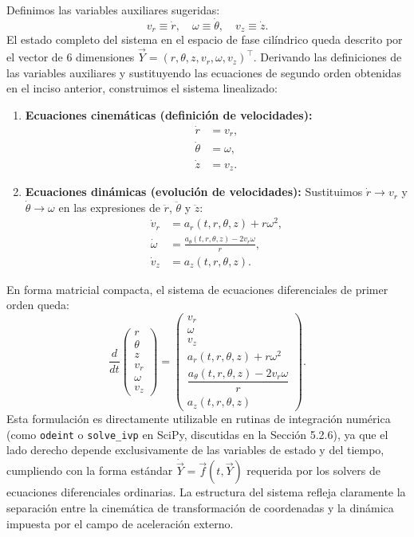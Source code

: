 \documentclass[12pt, a4paper]{article}
\begin{document}
Definimos las variables auxiliares sugeridas:
$$
v_r \equiv \dot{r}, \quad \omega \equiv \dot{\theta}, \quad v_z \equiv \dot{z}.
$$
El estado completo del sistema en el espacio de fase cilíndrico queda descrito por el vector de 6 dimensiones $\vec{Y} = (r, \theta, z, v_r, \omega, v_z)^\top$. Derivando las definiciones de las variables auxiliares y sustituyendo las ecuaciones de segundo orden obtenidas en el inciso anterior, construimos el sistema linealizado:

\begin{enumerate}
    \item \textbf{Ecuaciones cinemáticas (definición de velocidades):}
    \begin{align*}
        \dot{r} &= v_r, \\
        \dot{\theta} &= \omega, \\
        \dot{z} &= v_z.
    \end{align*}
    
    \item \textbf{Ecuaciones dinámicas (evolución de velocidades):}
    Sustituimos $\dot{r} \to v_r$ y $\dot{\theta} \to \omega$ en las expresiones de $\ddot{r}$, $\ddot{\theta}$ y $\ddot{z}$:
    \begin{align*}
        \dot{v}_r &= a_r(t, r, \theta, z) + r \omega^2, \\
        \dot{\omega} &= \frac{a_\theta(t, r, \theta, z) - 2 v_r \omega}{r}, \\
        \dot{v}_z &= a_z(t, r, \theta, z).
    \end{align*}
\end{enumerate}

En forma matricial compacta, el sistema de ecuaciones diferenciales de primer orden queda:
$$
\frac{d}{dt}
\begin{pmatrix}
r \\ \theta \\ z \\ v_r \\ \omega \\ v_z
\end{pmatrix}
=
\begin{pmatrix}
v_r \\ \omega \\ v_z \\ a_r(t, r, \theta, z) + r \omega^2 \\ \dfrac{a_\theta(t, r, \theta, z) - 2 v_r \omega}{r} \\ a_z(t, r, \theta, z)
\end{pmatrix}.
$$
Esta formulación es directamente utilizable en rutinas de integración numérica (como \texttt{odeint} o \texttt{solve\_ivp} en SciPy, discutidas en la Sección 5.2.6), ya que el lado derecho depende exclusivamente de las variables de estado y del tiempo, cumpliendo con la forma estándar $\dot{\vec{Y}} = \vec{f}(t, \vec{Y})$ requerida por los solvers de ecuaciones diferenciales ordinarias. La estructura del sistema refleja claramente la separación entre la cinemática de transformación de coordenadas y la dinámica impuesta por el campo de aceleración externo.
\end{document}
